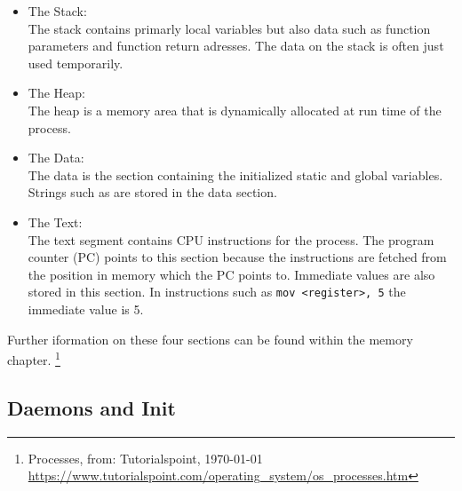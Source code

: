 \begin{itemize}
\item The Stack: \\

The stack contains primarly local variables but also data such as function parameters and function return adresses. The data on the stack is often just used temporarily.
\item The Heap: \\

The heap is a memory area that is dynamically allocated at run time of the process.
\item The Data: \\

	The data is the section containing the initialized static and global variables. Strings such as  are stored
	in the data section.
\item The Text: \\

	The text segment contains CPU instructions for the process. The program counter (PC) points to this section because the instructions are
		fetched from the position in memory which the PC points to. Immediate values are also stored in this section.
		In instructions such as \texttt{mov \textless register\textgreater, 5} the immediate value is 5.
\end{itemize}

Further iformation on these four sections can be found within the memory chapter. \footnote{Processes, from: Tutorialspoint, \today \\ \url{https://www.tutorialspoint.com/operating_system/os_processes.htm} }


\subsection{Daemons and Init}

